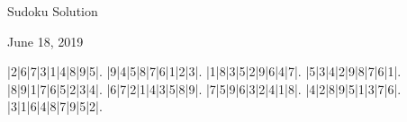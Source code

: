 \documentclass{article}
\begin{document}
\begin{center}
\Huge{Sudoku Solution}
\end{center}
\begin{center}
\Large{June 18, 2019}
\end{center}
\begin{sudoku}
|2|6|7|3|1|4|8|9|5|.
|9|4|5|8|7|6|1|2|3|.
|1|8|3|5|2|9|6|4|7|.
|5|3|4|2|9|8|7|6|1|.
|8|9|1|7|6|5|2|3|4|.
|6|7|2|1|4|3|5|8|9|.
|7|5|9|6|3|2|4|1|8|.
|4|2|8|9|5|1|3|7|6|.
|3|1|6|4|8|7|9|5|2|.
\end{sudoku}
\end{document}
